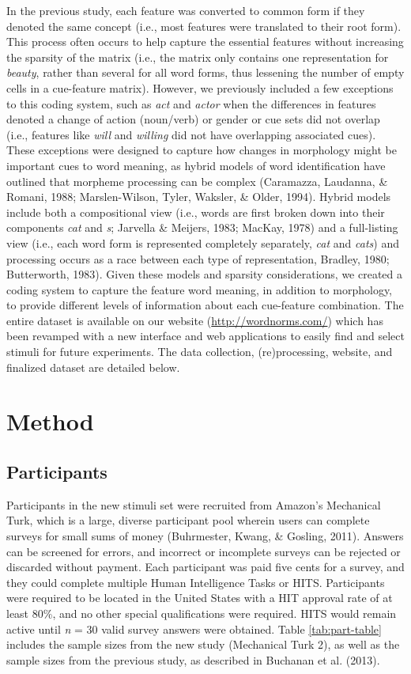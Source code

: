 \documentclass[english,,man]{apa6}
\theoremstyle{definition}
\theoremstyle{definition}
\theoremstyle{definition}
\theoremstyle{remark}
\begin{document}
In the previous study, each feature was converted to common form if they
denoted the same concept (i.e., most features were translated to their
root form). This process often occurs to help capture the essential
features without increasing the sparsity of the matrix (i.e., the matrix
only contains one representation for \emph{beauty}, rather than several
for all word forms, thus lessening the number of empty cells in a
cue-feature matrix). However, we previously included a few exceptions to
this coding system, such as \emph{act} and \emph{actor} when the
differences in features denoted a change of action (noun/verb) or gender
or cue sets did not overlap (i.e., features like \emph{will} and
\emph{willing} did not have overlapping associated cues). These
exceptions were designed to capture how changes in morphology might be
important cues to word meaning, as hybrid models of word identification
have outlined that morpheme processing can be complex (Caramazza,
Laudanna, \& Romani, 1988; Marslen-Wilson, Tyler, Waksler, \& Older,
1994). Hybrid models include both a compositional view (i.e., words are
first broken down into their components \emph{cat} and \emph{s};
Jarvella \& Meijers, 1983; MacKay, 1978) and a full-listing view (i.e.,
each word form is represented completely separately, \emph{cat} and
\emph{cats}) and processing occurs as a race between each type of
representation, Bradley, 1980; Butterworth, 1983). Given these models
and sparsity considerations, we created a coding system to capture the
feature word meaning, in addition to morphology, to provide different
levels of information about each cue-feature combination. The entire
dataset is available on our website (\url{http://wordnorms.com/}) which
has been revamped with a new interface and web applications to easily
find and select stimuli for future experiments. The data collection,
(re)processing, website, and finalized dataset are detailed below.

\section{Method}\label{method}

\subsection{Participants}\label{participants}

Participants in the new stimuli set were recruited from Amazon's
Mechanical Turk, which is a large, diverse participant pool wherein
users can complete surveys for small sums of money (Buhrmester, Kwang,
\& Gosling, 2011). Answers can be screened for errors, and incorrect or
incomplete surveys can be rejected or discarded without payment. Each
participant was paid five cents for a survey, and they could complete
multiple Human Intelligence Tasks or HITS. Participants were required to
be located in the United States with a HIT approval rate of at least
80\%, and no other special qualifications were required. HITS would
remain active until \emph{n} = 30 valid survey answers were obtained.
Table \ref{tab:part-table} includes the sample sizes from the new study
(Mechanical Turk 2), as well as the sample sizes from the previous
study, as described in Buchanan et al. (2013).
\end{document}
